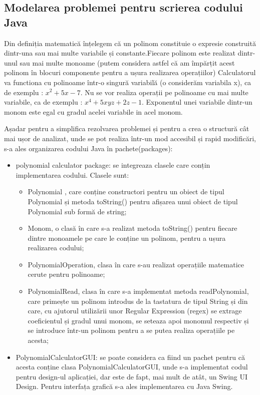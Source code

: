 \documentclass[a4paper,12pt]{article}
\begin{document}
\subsection{Modelarea problemei pentru scrierea codului Java}
Din definiția matematică înțelegem că un polinom constituie o expresie construită dintr-una sau mai multe variabile și constante.Fiecare polinom este realizat dintr-unul sau mai multe monoame (putem considera astfel că am împărțit acest polinom în blocuri componente pentru a ușura realizarea operațiilor)
Calculatorul va functiona cu polinoame într-o singură variabilă (o considerăm variabila x), ca de exemplu : $x^2+5x-7$. Nu se vor realiza operații pe polinoame cu mai multe variabile, ca de exemplu : $x^4+5xyz+2z - 1$.
Exponentul unei variabile dintr-un monom este egal cu gradul acelei variabile in acel monom.

 \newline
 Așadar pentru a simplifica rezolvarea problemei și pentru a crea o structură cât mai ușor de analizat, unde se pot realiza într-un mod accesibil și rapid modificări, s-a ales organizarea codului Java în pachete(packages): 
 \begin{itemize}
 \item polynomial calculator package: 
 se integreaza clasele care conțin implementarea codului. Clasele sunt: 
 \begin{itemize}
  \item Polynomial , care conține constructori pentru un obiect de tipul Polynomial și metoda toString() pentru afișarea unui obiect de tipul Polynomial sub formă de string;
   \item Monom, o clasă în care s-a realizat metoda toString() pentru fiecare dintre monoamele pe care le conține un polinom, pentru a ușura realizarea codului; 
   \item PolynomialOperation, clasa în care s-au realizat operațiile matematice cerute pentru polinoame;
    \item PolynomialRead, clasa în care s-a implementat metoda readPolynomial, care primește un polinom introdus de la tastatura de tipul String și din care, cu ajutorul utilizării unor Regular Expression (regex) se extrage coeficientul și gradul unui monom, se seteaza apoi monomul respectiv și se introduce într-un polinom pentru a se putea realiza operațiile pe acesta;
\end{itemize}
\item PolynomialCalculatorGUI: se poate considera ca fiind un pachet pentru că acesta conține clasa PolynomialCalculatorGUI, unde s-a implementat codul pentru design-ul aplicației, dar este de fapt, mai mult de atât, un Swing UI Design. Pentru interfața grafică s-a ales implementarea cu Java Swing.
\end{itemize}
\end{document}
